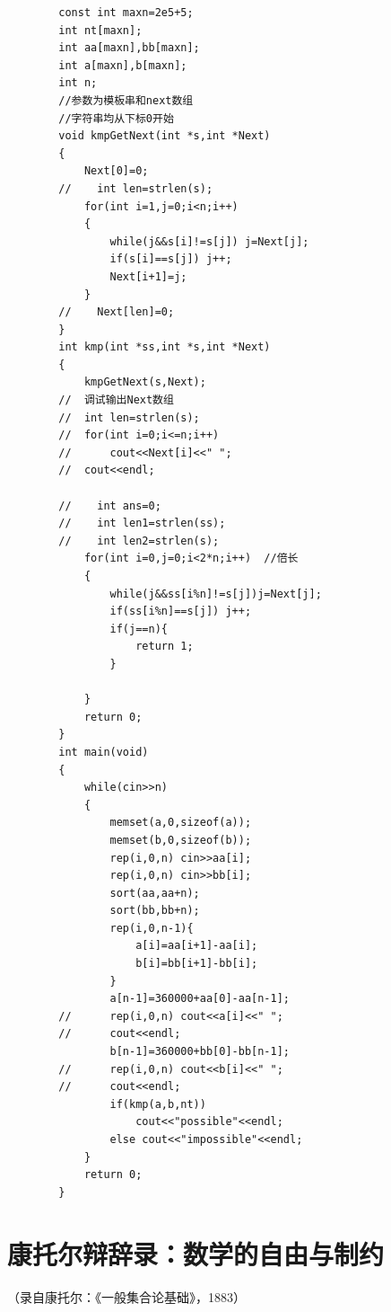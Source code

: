     \begin{lstlisting}
        const int maxn=2e5+5; 
        int nt[maxn];
        int aa[maxn],bb[maxn];
        int a[maxn],b[maxn];
        int n;
        //参数为模板串和next数组
        //字符串均从下标0开始
        void kmpGetNext(int *s,int *Next)
        {
            Next[0]=0;
        //    int len=strlen(s);
            for(int i=1,j=0;i<n;i++)
            {
                while(j&&s[i]!=s[j]) j=Next[j];
                if(s[i]==s[j]) j++;
                Next[i+1]=j;
            }
        //    Next[len]=0;
        }
        int kmp(int *ss,int *s,int *Next)
        {
            kmpGetNext(s,Next);
        //  调试输出Next数组
        //	int len=strlen(s);
        //	for(int i=0;i<=n;i++)
        //		cout<<Next[i]<<" ";
        //	cout<<endl; 
        
        //    int ans=0;
        //    int len1=strlen(ss);
        //    int len2=strlen(s);
            for(int i=0,j=0;i<2*n;i++)  //倍长 
            {
                while(j&&ss[i%n]!=s[j])j=Next[j];
                if(ss[i%n]==s[j]) j++;
                if(j==n){
                    return 1;
                }
                   
            }
            return 0;
        }
        int main(void)
        {
            while(cin>>n)
            {
                memset(a,0,sizeof(a));
                memset(b,0,sizeof(b));
                rep(i,0,n) cin>>aa[i];
                rep(i,0,n) cin>>bb[i];
                sort(aa,aa+n);
                sort(bb,bb+n);
                rep(i,0,n-1){
                    a[i]=aa[i+1]-aa[i];
                    b[i]=bb[i+1]-bb[i];
                }
                a[n-1]=360000+aa[0]-aa[n-1];
        //		rep(i,0,n) cout<<a[i]<<" ";
        //		cout<<endl;
                b[n-1]=360000+bb[0]-bb[n-1];
        //		rep(i,0,n) cout<<b[i]<<" ";
        //		cout<<endl;
                if(kmp(a,b,nt))
                    cout<<"possible"<<endl;
                else cout<<"impossible"<<endl;
            }
            return 0;
        }
    \end{lstlisting}
    
    \chapter{康托尔辩辞录：数学的自由与制约}
    
    （录自康托尔：《一般集合论基础》，1883）
    
